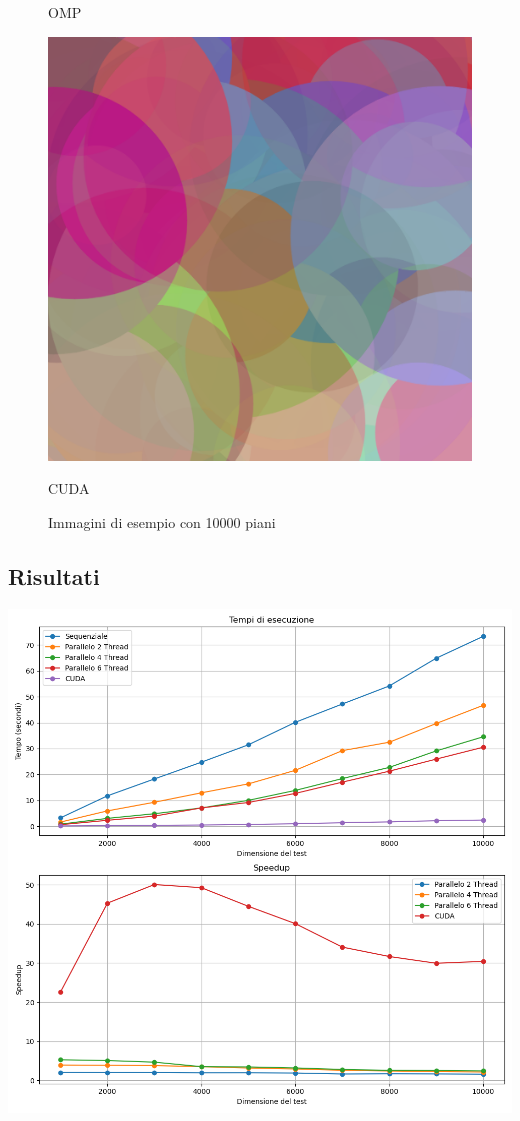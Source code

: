 \documentclass[11pt]{article}
\begin{document}
\begin{figure}
\begin{minipage}{0.32\textwidth}
            \caption{OMP}
        \end{minipage}%
        \hfill
        \begin{minipage}{0.32\textwidth}
            \centering
            \includegraphics[width=\textwidth]{img/cuda/10000}
            \caption{CUDA}
        \end{minipage}
        \caption{Immagini di esempio con 10000 piani}\label{fig:example-images}
    \end{figure}

    \subsection{Risultati}\label{subsec:plots}
    \includegraphics[width=\textwidth]{plots/results}
\end{document}
